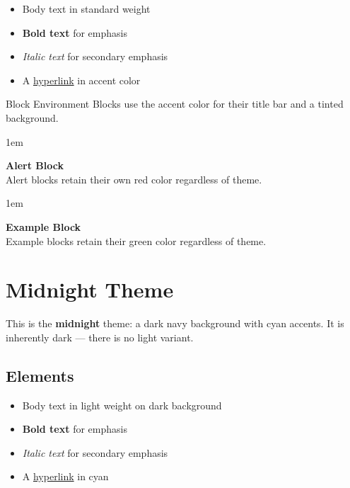 \documentclass[
    language=english,
    doctype=article,
    institution=none,
    titlestyle=simple,
]{../../omnilatex}
\begin{document}
\begin{itemize}
    \item Body text in standard weight
    \item \textbf{Bold text} for emphasis
    \item \textit{Italic text} for secondary emphasis
    \item A \href{https://github.com/WyattAu/OmniLaTeX-template}{hyperlink} in accent color
\end{itemize}

\begin{block}{Block Environment}
    Blocks use the accent color for their title bar and a tinted background.
\end{block}

\begin{addmargin}{1em}
\colorbox{red!10}{\parbox{0.95\linewidth}{\textbf{Alert Block}\\Alert blocks retain their own red color regardless of theme.}}
\end{addmargin}

\begin{addmargin}{1em}
\colorbox{green!10}{\parbox{0.95\linewidth}{\textbf{Example Block}\\Example blocks retain their green color regardless of theme.}}
\end{addmargin}

\newpage


\section{Midnight Theme}


This is the \textbf{midnight} theme: a dark navy background with cyan accents.
It is inherently dark — there is no light variant.

\subsection{Elements}

\begin{itemize}
    \item Body text in light weight on dark background
    \item \textbf{Bold text} for emphasis
    \item \textit{Italic text} for secondary emphasis
    \item A \href{https://github.com/WyattAu/OmniLaTeX-template}{hyperlink} in cyan
\end{itemize}
\end{document}
